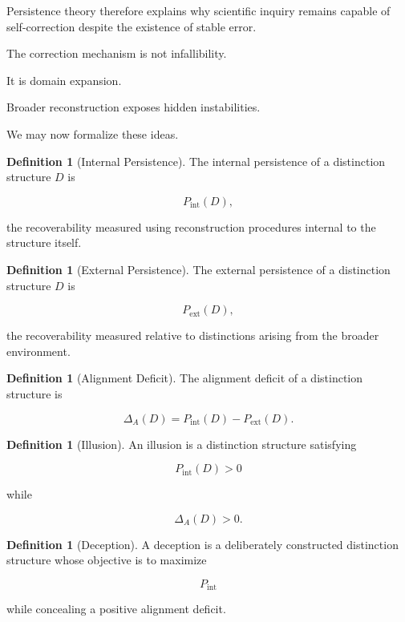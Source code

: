 \documentclass[12pt,oneside]{article}
\theoremstyle{definition}
\newtheorem{definition}[theorem]{Definition} \newtheorem{axiom}[theorem]{Axiom} \newtheorem{remark}[theorem]{Remark} \newtheorem{example}[theorem]{Example}
\begin{document}
Persistence theory therefore explains why scientific inquiry remains capable of self-correction despite the existence of stable error.

The correction mechanism is not infallibility.

It is domain expansion.

Broader reconstruction exposes hidden instabilities.

We may now formalize these ideas.

\begin{definition}[Internal Persistence]

The internal persistence of a distinction structure \(D\) is

\[
P_{\mathrm{int}}(D),
\]

the recoverability measured using reconstruction procedures internal to the structure itself.

\end{definition}

\begin{definition}[External Persistence]

The external persistence of a distinction structure \(D\) is

\[
P_{\mathrm{ext}}(D),
\]

the recoverability measured relative to distinctions arising from the broader environment.

\end{definition}

\begin{definition}[Alignment Deficit]

The alignment deficit of a distinction structure is

\[
\Delta_A(D)
=
P_{\mathrm{int}}(D)
-
P_{\mathrm{ext}}(D).
\]

\end{definition}

\begin{definition}[Illusion]

An illusion is a distinction structure satisfying

\[
P_{\mathrm{int}}(D)
>
0
\]

while

\[
\Delta_A(D)
>
0.
\]

\end{definition}

\begin{definition}[Deception]

A deception is a deliberately constructed distinction structure whose objective is to maximize

\[
P_{\mathrm{int}}
\]

while concealing a positive alignment deficit.

\end{definition}
\end{document}
